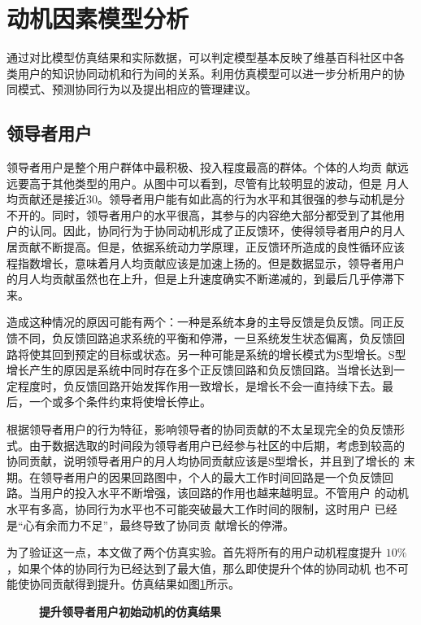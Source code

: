\section{动机因素模型分析}
通过对比模型仿真结果和实际数据，可以判定模型基本反映了维基百科社区中各
类用户的知识协同动机和行为间的关系。利用仿真模型可以进一步分析用户的协
同模式、预测协同行为以及提出相应的管理建议。

\subsection{领导者用户}

领导者用户是整个用户群体中最积极、投入程度最高的群体。个体的人均贡
献远远要高于其他类型的用户。从图中可以看到，尽管有比较明显的波动，但是
月人均贡献还是接近30。领导者用户能有如此高的行为水平和其很强的参与动机是分
不开的。同时，领导者用户的水平很高，其参与的内容绝大部分都受到了其他用
户的认同。因此，协同行为于协同动机形成了正反馈环，使得领导者用户的月人
居贡献不断提高。但是，依据系统动力学原理，正反馈环所造成的良性循环应该
程指数增长，意味着月人均贡献应该是加速上扬的。但是数据显示，领导者用户
的月人均贡献虽然也在上升，但是上升速度确实不断递减的，到最后几乎停滞下
来。

造成这种情况的原因可能有两个：一种是系统本身的主导反馈是负反馈。同正反
馈不同，负反馈回路追求系统的平衡和停滞，一旦系统发生状态偏离，负反馈回
路将使其回到预定的目标或状态。另一种可能是系统的增长模式为S型增长。S型
增长产生的原因是系统中同时存在多个正反馈回路和负反馈回路。当增长达到一
定程度时，负反馈回路开始发挥作用一致增长，是增长不会一直持续下去。最
后，一个或多个条件约束将使增长停止。

根据领导者用户的行为特征，影响领导者的协同贡献的不太呈现完全的负反馈形
式。由于数据选取的时间段为领导者用户已经参与社区的中后期，考虑到较高的
协同贡献，说明领导者用户的月人均协同贡献应该是S型增长，并且到了增长的
末期。在领导者用户的因果回路图中，个人的最大工作时间回路是一个负反馈回
路。当用户的投入水平不断增强，该回路的作用也越来越明显。不管用户
的动机水平有多高，协同行为水平也不可能突破最大工作时间的限制，这时用户
已经是“心有余而力不足”，最终导致了协同贡
献增长的停滞。

为了验证这一点，本文做了两个仿真实验。首先将所有的用户动机程度提升
$10\%$，如果个体的协同行为已经达到了最大值，那么即使提升个体的协同动机
也不可能使协同贡献得到提升。仿真结果如图\ref{fig:improve1}所示。

\begin{figure}
  \centering
  
  \caption{\small{\textbf{提升领导者用户初始动机的仿真结果}}}
  \label{fig:improve1}
\end{figure}

